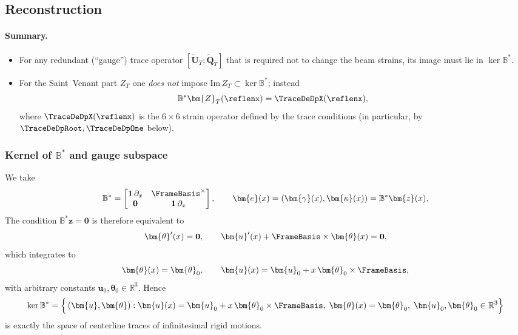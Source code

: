 \subsection{Reconstruction}

\paragraph{Summary.}
\begin{itemize}
  \item For any redundant (``gauge'') trace operator $[\tilde{\bm U}_T;\tilde{\bm Q}_T]$ that is required not to change the beam strains, its image must lie in $\ker\mathbb{B}^*$.
  \item For the Saint~Venant part $Z_T$ one \emph{does not} impose $\mathrm{Im}\,Z_T \subset \ker\mathbb{B}^*$; instead
  \[
    \mathbb{B}^* \bm{Z}_T(\reflenx) = \TraceDeDpX(\reflenx),
  \]
  where $\TraceDeDpX(\reflenx)$ is the $6\times 6$ strain operator defined by the trace conditions (in particular, by $\TraceDeDpRoot,\TraceDeDpOne$ below).
\end{itemize}

\subsubsection{Kernel of $\mathbb{B}^*$ and gauge subspace}

We take
\[
  \mathbb{B}^*
  =
  \begin{bmatrix}
    \mathbf{1}\,\partial_x & \FrameBasis^{\times} \\
    \mathbf{0}             & \mathbf{1}\,\partial_x
  \end{bmatrix},
  \qquad
  \bm{e}(x) = (\bm{\gamma}(x),\bm{\kappa}(x))
  =
  \mathbb{B}^*\bm{z}(x),
\]
The condition $\mathbb{B}^*\bm{z}=\mathbf{0}$ is therefore equivalent to
\[
  \bm{\theta}'(x) = \mathbf{0},
  \qquad
  \bm{u}'(x) + \FrameBasis\times\bm{\theta}(x) = \mathbf{0},
\]
which integrates to
\[
  \bm{\theta}(x) = \bm{\theta}_0,
  \qquad
  \bm{u}(x) = \bm{u}_0 + x\,\bm{\theta}_0\times\FrameBasis,
\]
with arbitrary constants $\bm{u}_0,\bm{\theta}_0\in\mathbb{R}^3$. Hence
\[
  \ker\mathbb{B}^*
  =
  \Bigl\{\,(\bm{u},\bm{\theta}) : 
   \bm{u}(x) = \bm{u}_0 + x\,\bm{\theta}_0\times\FrameBasis,\;
   \bm{\theta}(x) = \bm{\theta}_0,\;
   \bm{u}_0,\bm{\theta}_0\in\mathbb{R}^3
  \Bigr\}
\]
is exactly the space of centerline traces of infinitesimal rigid motions.


